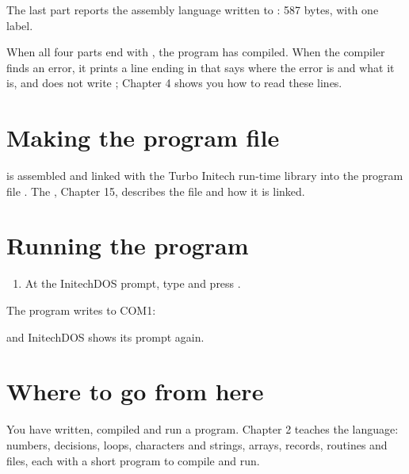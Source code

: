 
The last part reports the assembly language written to :
587 bytes, with one label.


When all four parts end with
, the program has compiled.  When the compiler finds an error, it
prints a line ending in  that says where the error is and what
it is, and does not write ; Chapter 4 shows you how to read
these lines.

\section{Making the program file}
 is assembled and linked with the Turbo Initech run-time
library into the program file .  The
, Chapter 15, describes the file and how it is
linked.

\section{Running the program}
\begin{enumerate}
\item At the InitechDOS prompt, type  and press .
\end{enumerate}

The program writes to COM1:


and InitechDOS shows its prompt again.

\section{Where to go from here}
You have written, compiled and run a program.  Chapter 2 teaches the
language: numbers, decisions, loops, characters and strings, arrays,
records, routines and files, each with a short program to compile and run.
